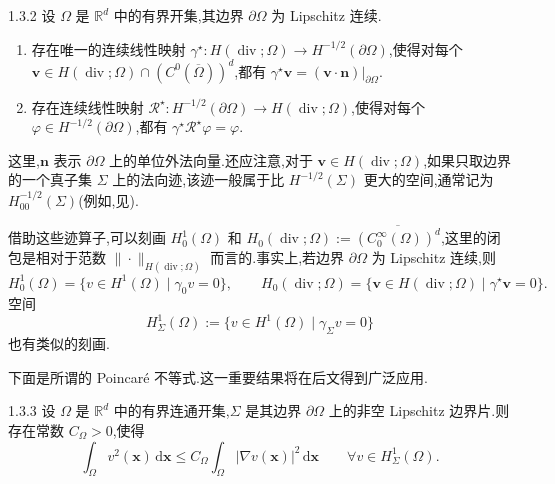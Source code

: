 \begin{theorem}[向量函数的迹定理]{1.3.2}
设 \(\Omega\) 是 \(\mathbb R^d\) 中的有界开集,其边界 \(\partial\Omega\) 为 Lipschitz 连续.
\begin{enumerate}[label=\alph*.,leftmargin=*]
  \item 存在唯一的连续线性映射 \(\gamma^\star\colon H(\operatorname{div};\Omega)\to H^{-1/2}(\partial\Omega)\),使得对每个 \(\boldsymbol{v}\in H(\operatorname{div};\Omega)\cap(C^0(\overline\Omega))^d\),都有 \(\gamma^\star\boldsymbol{v}=(\boldsymbol{v}\cdot\boldsymbol{n})|_{\partial\Omega}\).
  \item 存在连续线性映射 \(\mathcal R^\star\colon H^{-1/2}(\partial\Omega)\to H(\operatorname{div};\Omega)\),使得对每个 \(\varphi\in H^{-1/2}(\partial\Omega)\),都有 \(\gamma^\star\mathcal R^\star\varphi=\varphi\).
\end{enumerate}
\end{theorem}

这里,\(\boldsymbol{n}\) 表示 \(\partial\Omega\) 上的单位外法向量.还应注意,对于 \(\boldsymbol{v}\in H(\operatorname{div};\Omega)\),如果只取边界的一个真子集 \(\Sigma\) 上的法向迹,该迹一般属于比 \(H^{-1/2}(\Sigma)\) 更大的空间,通常记为 \(H^{-1/2}_{00}(\Sigma)\)(例如,见).

借助这些迹算子,可以刻画 \(H^1_0(\Omega)\) 和 \(H_0(\operatorname{div};\Omega):=\overline{(C^\infty_0(\Omega))^d}\),这里的闭包是相对于范数 \(\|\cdot\|_{H(\operatorname{div};\Omega)}\) 而言的.事实上,若边界 \(\partial\Omega\) 为 Lipschitz 连续,则
\[
  H^1_0(\Omega)=\{v\in H^1(\Omega)\mid\gamma_0v=0\},\qquad
  H_0(\operatorname{div};\Omega)
   =\{\boldsymbol{v}\in H(\operatorname{div};\Omega)\mid\gamma^\star\boldsymbol{v}=0\}.
\]
空间
\[
  H^1_\Sigma(\Omega):=\{v\in H^1(\Omega)\mid\gamma_\Sigma v=0\}
\]
也有类似的刻画.

下面是所谓的 Poincaré 不等式.这一重要结果将在后文得到广泛应用.

\begin{theorem}{1.3.3}
设 \(\Omega\) 是 \(\mathbb R^d\) 中的有界连通开集,\(\Sigma\) 是其边界 \(\partial\Omega\) 上的非空 Lipschitz 边界片.则存在常数 \(C_\Omega>0\),使得
\begin{equation}\label{eq:1.3.2}
  \int_\Omega v^2(\boldsymbol{x})\,\mathrm d\boldsymbol{x}
  \le C_\Omega\int_\Omega|\nabla v(\boldsymbol{x})|^2\,\mathrm d\boldsymbol{x}
  \qquad \forall v\in H^1_\Sigma(\Omega).
\end{equation}
\end{theorem}

